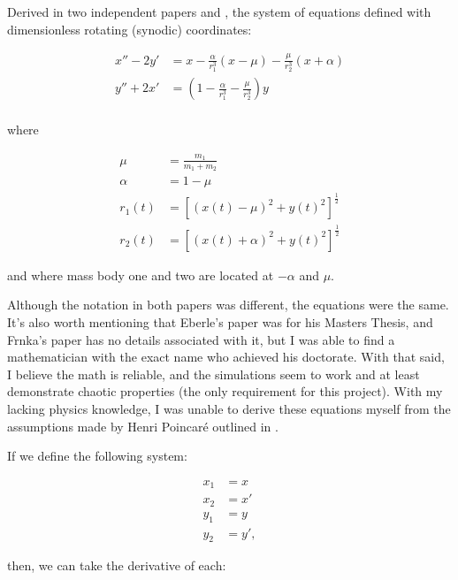 \documentclass{article}
\begin{document}
Derived in two independent papers \cite{eberle2007case} and \cite{frnkacase},
the system of equations defined with dimensionless rotating (synodic)
coordinates:

\begin{align}
    x'' - 2 y' &= x
        - \frac{\alpha}{r_1^3} (x - \mu)
        - \frac{\mu}{r_2^3} (x + \alpha) \nonumber \\
    y'' + 2 x' &= \left(
        1 - \frac{\alpha}{r_1^3}
        - \frac{\mu}{r_2^3}
    \right) y \nonumber \\
\end{align}

where 

\begin{align}
    \mu &= \frac{m_1}{m_1 + m_2} \nonumber \\
    \alpha &= 1 - \mu \nonumber \\
    r_1(t) &= \left[(x(t) - \mu)^2 + y(t)^2\right]^{\frac{1}{2}} \nonumber \\
    r_2(t) &= \left[(x(t) + \alpha)^2 + y(t)^2\right]^{\frac{1}{2}} \label{eq:reduc_3body_cor}
\end{align}
 
and where mass body one and two are located at $-\alpha$ and $\mu$.

Although the notation in both papers was different, the equations were the same. 
It's also worth mentioning that Eberle's paper was for his Masters Thesis, and 
Frnka's paper has no details associated with it, but I was able to find a 
mathematician with the exact name who achieved his doctorate. With that said, 
I believe the math is reliable, and the simulations seem to work and at least 
demonstrate chaotic properties (the only requirement for this project). With my
lacking physics knowledge, I was unable to derive these equations myself from
the assumptions made by Henri Poincaré outlined in 
\cite{chenciner2000remarkable}.

If we define the following system:

\begin{align}
    x_1 &= x \nonumber \\
    x_2 &= x' \nonumber \\
    y_1 &= y \nonumber \\
    y_2 &= y', \label{eq:first_order_def}
\end{align}

then, we can take the derivative of each:
\end{document}
